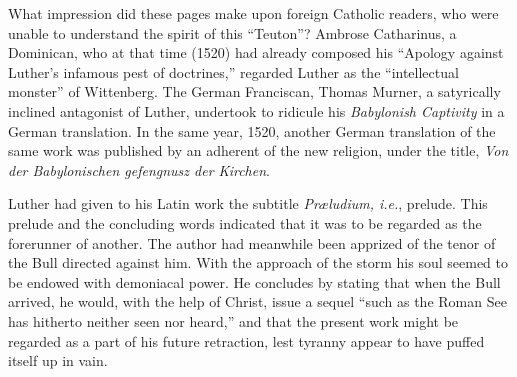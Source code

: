 What impression did these pages make upon foreign Catholic
readers, who were unable to understand the spirit of this “Teuton”?
Ambrose Catharinus, a Dominican, who at that time (1520) had
already composed his “Apology against Luther’s infamous pest of
doctrines,” regarded Luther as the “intellectual monster” of Wittenberg.
The German Franciscan, Thomas Murner, a satyrically inclined
antagonist of Luther, undertook to ridicule his \textit{Babylonish Captivity}
in a German translation. In the same year, 1520, another German
translation of the same work was published by an adherent of the
new religion, under the title, \textit{Von der Babylonischen gefengnusz der
Kirchen}.

Luther had given to his Latin work the subtitle \textit{Præludium, i.e.},
prelude. This prelude and the concluding words indicated that it was
to be regarded as the forerunner of another. The author had meanwhile been
apprized of the tenor of the Bull directed against him.
With the approach of the storm his soul seemed to be endowed with
demoniacal power. He concludes by stating that when the Bull arrived, he
would, with the help of Christ, issue a sequel “such as the
Roman See has hitherto neither seen nor heard,” and that the present
work might be regarded as a part of his future retraction, lest tyranny
appear to have puffed itself up in vain.
